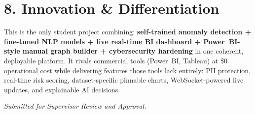\documentclass[10pt,twocolumn]{article}
\begin{document}
\section{8. Innovation \& Differentiation}

This is the only student project combining: \textbf{self-trained anomaly detection
+ fine-tuned NLP models + live real-time BI dashboard + Power~BI-style manual
graph builder + cybersecurity hardening} in one coherent, deployable platform.
It rivals commercial tools (Power~BI, Tableau) at \$0 operational cost while
delivering features those tools lack entirely: PII protection, real-time risk
scoring, dataset-specific pinnable charts, WebSocket-powered live updates, and
explainable AI decisions.

\vspace{4pt}
\noindent\textit{Submitted for Supervisor Review and Approval.}
\end{document}
